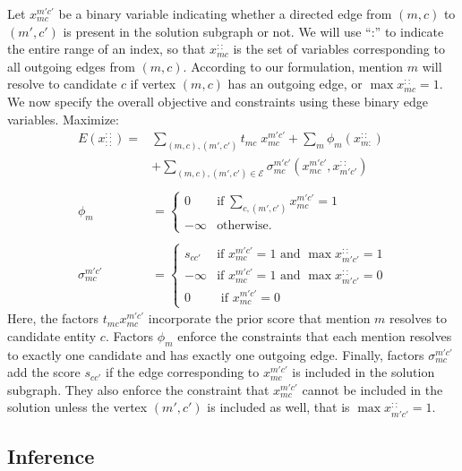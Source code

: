 Let $x_{mc}^{m'c'}$ be a binary variable indicating whether a directed edge from $(m, c)$ to $(m', c')$ is present in the solution subgraph or not. We will use ``:'' to indicate the entire range of an index, so that $x_{mc}^{::}$ is the set of variables corresponding to all outgoing edges from $(m,c)$.  According to our formulation, mention $m$ will resolve to candidate $c$ if vertex $(m,c)$ has an outgoing edge, or $ \max x_{mc}^{::}=1$. We now specify the overall objective and constraints using these binary edge variables. Maximize:
\begin{align}
E(x_{::}^{::}) =& \sum_{(m, c), (m',c')} t_{mc} \;x^{m'c'}_{mc}  + \sum_m \phi_m( x_{m:}^{::}) \nonumber \\
&+ \sum_{(m,c), (m', c') \in \mathcal{E}} \sigma_{mc}^{m'c'}(x_{mc}^{m'c'}, x_{m'c'}^{::}) \\ \nonumber \\
\phi_{m}&= 
\begin{cases} 
0 & \text{if} \; \sum_{c, (m',c')} x^{m'c'}_{mc} = 1 \\
-\infty & \text{otherwise.}
\end{cases} \\ \nonumber \\
\sigma_{mc}^{m'c'} &= %
\begin{cases}
 s_{cc'} & \text{if $x_{mc}^{m'c'}=1$ and $\max x_{m'c'}^{::} =1$} \\
 -\infty & \text{if $x_{mc}^{m'c'}=1$ and $\max x_{m'c'}^{::}=0$} \\
  0 & \text{ if $x_{mc}^{m'c'} = 0$ } 
 \end{cases}
\end{align}
Here, the factors $t_{mc} x_{mc}^{m'c'}$ incorporate the prior score that mention $m$ resolves to candidate entity $c$. 
Factors $\phi_m$ enforce the constraints that each mention resolves to exactly one candidate and has exactly one outgoing edge. 
Finally, factors $\sigma_{mc}^{m'c'}$ add the score $s_{cc'}$ if the edge corresponding to $x_{mc}^{m'c'}$ is included in the solution subgraph. They also enforce the constraint that $x_{mc}^{m'c'}$ cannot be included in the solution unless the vertex $(m', c')$ is included as well, that is  $\max x_{m'c'}^{::} = 1$.

%


\subsection{Inference}

